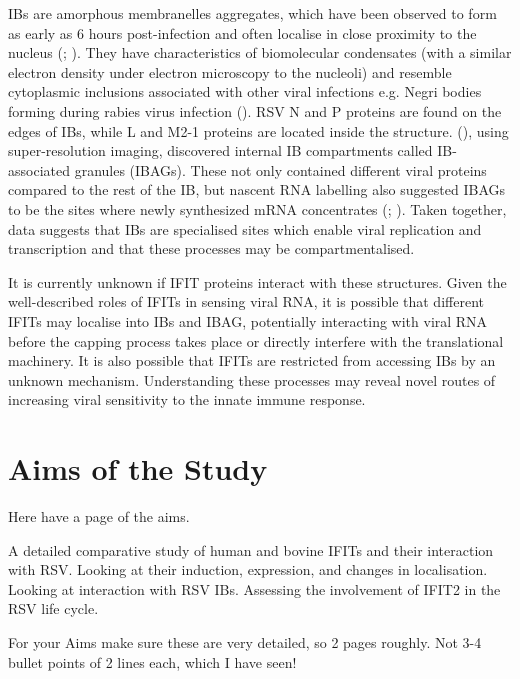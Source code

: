 IBs are amorphous membranelles aggregates, which have been observed to form as early as 6 hours post-infection and often localise in close proximity to the nucleus (\cite{Bachi1973MorphogenesisVirus}; \cite{Jobe2020RespiratorySignaling}). They have characteristics of biomolecular condensates (with a similar electron density under electron microscopy to the nucleoli) and resemble cytoplasmic inclusions associated with other viral infections e.g. Negri bodies forming during rabies virus infection (\cite{Nikolic2017NegriOrganelles}). RSV N and P proteins are found on the edges of IBs, while L and M2-1 proteins are located inside the structure. (\cite{Rincheval2017FunctionalVirus}), using super-resolution imaging, discovered internal IB compartments called IB-associated granules (IBAGs). These not only contained different viral proteins compared to the rest of the IB, but nascent RNA labelling also suggested IBAGs to be the sites where newly synthesized mRNA concentrates (\cite{Jobe2020RespiratorySignaling}; \cite{Richard2018RSVTranscription}). Taken together, data suggests that IBs are specialised sites which enable viral replication and transcription and that these processes may be compartmentalised.

It is currently unknown if IFIT proteins interact with these structures. Given the well-described roles of IFITs in sensing viral RNA, it is possible that different IFITs may localise into IBs and IBAG, potentially interacting with viral RNA before the capping process takes place or directly interfere with the translational machinery. It is also possible that IFITs are restricted from accessing IBs by an unknown mechanism. Understanding these processes may reveal novel routes of increasing viral sensitivity to the innate immune response.



\section{Aims of the Study} \label{sec:Aims}
Here have a page of the aims.

A detailed comparative study of human and bovine IFITs and their interaction with RSV. Looking at their induction, expression, and changes in localisation. Looking at interaction with RSV IBs. Assessing the involvement of IFIT2 in the RSV life cycle.

For your Aims make sure these are very detailed, so 2 pages roughly. Not 3-4 bullet points of 2 lines each, which I have seen!

